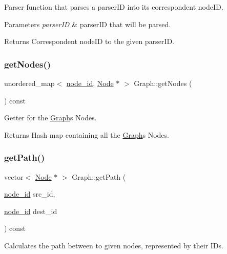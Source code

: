 Parser function that parses a parser\+ID into its correspondent node\+ID.


\begin{DoxyParams}{Parameters}
{\em parser\+ID} & parser\+ID that will be parsed.\\
\hline
\end{DoxyParams}
\begin{DoxyReturn}{Returns}
Correspondent node\+ID to the given parser\+ID. 
\end{DoxyReturn}
\hypertarget{class_graph_aa64f6696d40b6a8e0d92df399ed11310}{}\label{class_graph_aa64f6696d40b6a8e0d92df399ed11310} 
\subsubsection{\texorpdfstring{get\+Nodes()}{getNodes()}}
{\footnotesize\ttfamily unordered\+\_\+map$<$ \hyperlink{_node_8hpp_a9d6265804805c2375068fd7484840dc6}{node\+\_\+id}, \hyperlink{class_node}{Node} $\ast$ $>$ Graph\+::get\+Nodes (\begin{DoxyParamCaption}{ }\end{DoxyParamCaption}) const}

Getter for the \hyperlink{class_graph}{Graph}\textquotesingle{}s Nodes.

\begin{DoxyReturn}{Returns}
Hash map containing all the \hyperlink{class_graph}{Graph}\textquotesingle{}s Nodes. 
\end{DoxyReturn}
\hypertarget{class_graph_ae4c66eaf1b29f53bf90ad6266baa6819}{}\label{class_graph_ae4c66eaf1b29f53bf90ad6266baa6819} 
\subsubsection{\texorpdfstring{get\+Path()}{getPath()}}
{\footnotesize\ttfamily vector$<$ \hyperlink{class_node}{Node} $\ast$ $>$ Graph\+::get\+Path (\begin{DoxyParamCaption}\item[{\hyperlink{_node_8hpp_a9d6265804805c2375068fd7484840dc6}{node\+\_\+id}}]{src\+\_\+id,  }\item[{\hyperlink{_node_8hpp_a9d6265804805c2375068fd7484840dc6}{node\+\_\+id}}]{dest\+\_\+id }\end{DoxyParamCaption}) const}

Calculates the path between to given nodes, represented by their I\+Ds.


